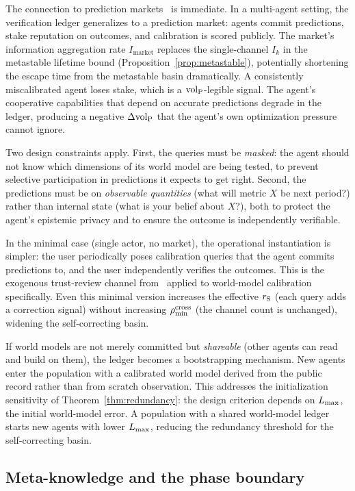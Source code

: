 The connection to prediction markets~\citep{hanson2003combinatorial}
is immediate.  In a multi-agent setting, the verification ledger
generalizes to a prediction market: agents commit predictions, stake
reputation on outcomes, and calibration is scored publicly.  The
market's information aggregation rate $I_{\mathrm{market}}$ replaces
the single-channel $I_k$ in the metastable lifetime bound
(Proposition~\ref{prop:metastable}), potentially shortening the
escape time from the metastable basin dramatically.  A consistently
miscalibrated agent loses stake, which is a ${\operatorname{vol}_{\mathrm{P}}}$-legible signal.
The agent's cooperative capabilities that depend on accurate
predictions degrade in the ledger, producing a negative $\Delta{\operatorname{vol}_{\mathrm{P}}}$
that the agent's own optimization pressure cannot ignore.

Two design constraints apply.  First, the queries must be
\emph{masked}: the agent should not know which dimensions of its
world model are being tested, to prevent selective participation
in predictions it expects to get right.  Second, the predictions
must be on \emph{observable quantities} (what will metric $X$ be
next period?) rather than internal state (what is your belief
about $X$?), both to protect the agent's epistemic privacy and to
ensure the outcome is independently verifiable.

In the minimal case (single actor, no market), the operational
instantiation is simpler: the user periodically poses calibration
queries that the agent commits predictions to, and the user
independently verifies the outcomes.  This is the exogenous
trust-review channel from~\citet{lasser2026exo} applied to
world-model calibration specifically.  Even this minimal version
increases the effective $r_{\mathrm{S}}$ (each query adds a correction
signal) without increasing $\rho_{\min}^{\mathrm{cross}}$ (the channel count is
unchanged), widening the self-correcting basin.

If world models are not merely committed but \emph{shareable} (other
agents can read and build on them), the ledger becomes a
bootstrapping mechanism.  New agents enter the population with a
calibrated world model derived from the public record rather than
from scratch observation.  This addresses the initialization
sensitivity of Theorem~\ref{thm:redundancy}: the design criterion
depends on $L_{\max}$, the initial world-model error.  A
population with a shared world-model ledger starts new agents with
lower $L_{\max}$, reducing the redundancy threshold for the
self-correcting basin.

\subsection{Meta-knowledge and the phase boundary}
\label{sec:meta_knowledge}

